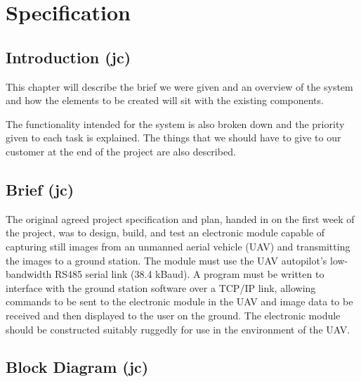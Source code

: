 \chapter{Specification}
\label{chap:specification}

\section{Introduction (jc)}

This chapter will describe the brief we were given and an overview of the system and how the elements to be created will sit with the existing components.

The functionality intended for the system is also broken down and the priority given to each task is explained. The things that we should have to give to our customer at the end of the project are also described.

\section{Brief (jc)}

The original agreed project specification and plan, handed in on the first week of the project, was to design, build, and test an electronic module capable of capturing still images from an unmanned aerial vehicle (UAV) and transmitting the images to a ground station. The module must use the UAV autopilot’s low-bandwidth RS485 serial link (38.4 kBaud). A program must be written to interface with the ground station software over a TCP/IP link, allowing commands to be sent to the electronic module in the UAV and image data to be received and then displayed to the user on the ground. The electronic module should be constructed suitably ruggedly for use in the environment of the UAV.

\section{Block Diagram (jc)}

